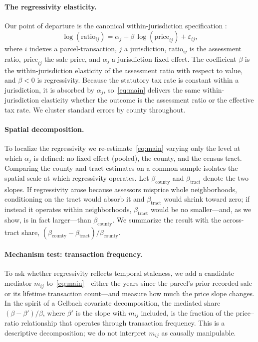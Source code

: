 \documentclass[12pt, letterpaper]{article}
\begin{document}
\paragraph{The regressivity elasticity.} Our point of departure is the canonical within-jurisdiction specification \citep{berry2021reassessing}:
\begin{equation}
\log(\text{ratio}_{ij}) = \alpha_j + \beta \, \log(\text{price}_{ij}) + \varepsilon_{ij},
\label{eq:main}
\end{equation}
where $i$ indexes a parcel-transaction, $j$ a jurisdiction, $\text{ratio}_{ij}$ is the assessment ratio, $\text{price}_{ij}$ the sale price, and $\alpha_j$ a jurisdiction fixed effect. The coefficient $\beta$ is the within-jurisdiction elasticity of the assessment ratio with respect to value, and $\beta < 0$ is regressivity. Because the statutory tax rate is constant within a jurisdiction, it is absorbed by $\alpha_j$, so~\eqref{eq:main} delivers the same within-jurisdiction elasticity whether the outcome is the assessment ratio or the effective tax rate. We cluster standard errors by county throughout.

\paragraph{Spatial decomposition.} To localize the regressivity we re-estimate~\eqref{eq:main} varying only the level at which $\alpha_j$ is defined: no fixed effect (pooled), the county, and the census tract. Comparing the county and tract estimates on a common sample isolates the spatial scale at which regressivity operates. Let $\beta_{\text{county}}$ and $\beta_{\text{tract}}$ denote the two slopes. If regressivity arose because assessors misprice whole neighborhoods, conditioning on the tract would absorb it and $\beta_{\text{tract}}$ would shrink toward zero; if instead it operates within neighborhoods, $\beta_{\text{tract}}$ would be no smaller---and, as we show, is in fact larger---than $\beta_{\text{county}}$. We summarize the result with the across-tract share, $(\beta_{\text{county}} - \beta_{\text{tract}})/\beta_{\text{county}}$.

\paragraph{Mechanism test: transaction frequency.} To ask whether regressivity reflects temporal staleness, we add a candidate mediator $m_{ij}$ to~\eqref{eq:main}---either the years since the parcel's prior recorded sale or its lifetime transaction count---and measure how much the price slope changes. In the spirit of a Gelbach covariate decomposition, the mediated share $(\beta - \beta')/\beta$, where $\beta'$ is the slope with $m_{ij}$ included, is the fraction of the price--ratio relationship that operates through transaction frequency. This is a descriptive decomposition; we do not interpret $m_{ij}$ as causally manipulable.
\end{document}

